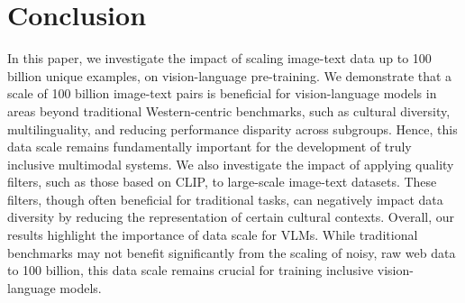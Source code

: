 \section{Conclusion}










In this paper, we investigate the impact of scaling image-text data up to 100 billion unique examples, on vision-language pre-training.
We demonstrate that a scale of 100 billion image-text pairs is beneficial for vision-language models in areas beyond traditional Western-centric benchmarks, such as cultural diversity, multilinguality, and reducing performance disparity across subgroups. Hence, this data scale remains fundamentally important for the development of truly inclusive multimodal systems.
We also investigate the impact of applying quality filters, such as those based on CLIP, to large-scale image-text datasets. These filters, though often beneficial for traditional tasks, can negatively impact data diversity by reducing the representation of certain cultural contexts.
Overall, our results highlight the importance of data scale for VLMs. While traditional benchmarks may not benefit significantly from the scaling of noisy, raw web data to 100 billion, this data scale remains crucial for training inclusive vision-language models.

